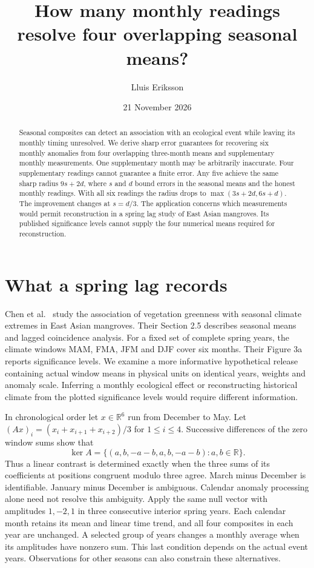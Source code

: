 \documentclass[11pt]{article}
\title{How many monthly readings resolve four overlapping seasonal means?}
\author{Lluis Eriksson}\date{21 November 2026}
\begin{document}
\maketitle
\begin{abstract}
Seasonal composites can detect an association with an ecological event while leaving its monthly timing unresolved. We derive sharp error guarantees for recovering six monthly anomalies from four overlapping three-month means and supplementary monthly measurements. One supplementary month may be arbitrarily inaccurate. Four supplementary readings cannot guarantee a finite error. Any five achieve the same sharp radius $9s+2d$, where $s$ and $d$ bound errors in the seasonal means and the honest monthly readings. With all six readings the radius drops to $\max(3s+2d,6s+d)$. The improvement changes at $s=d/3$. The application concerns which measurements would permit reconstruction in a spring lag study of East Asian mangroves. Its published significance levels cannot supply the four numerical means required for reconstruction.
\end{abstract}
\section{What a spring lag records}
Chen et al.\ \cite{chen} study the association of vegetation greenness with seasonal climate extremes in East Asian mangroves. Their Section 2.5 describes seasonal means and lagged coincidence analysis. For a fixed set of complete spring years, the climate windows MAM, FMA, JFM and DJF cover six months. Their Figure 3a reports significance levels. We examine a more informative hypothetical release containing actual window means in physical units on identical years, weights and anomaly scale. Inferring a monthly ecological effect or reconstructing historical climate from the plotted significance levels would require different information.

In chronological order let $x\in\mathbb R^6$ run from December to May. Let $(Ax)_i=(x_i+x_{i+1}+x_{i+2})/3$ for $1\leq i\leq4$. Successive differences of the zero window sums show that
\[
 \ker A=\{(a,b,-a-b,a,b,-a-b):a,b\in\mathbb R\}.
\]
Thus a linear contrast is determined exactly when the three sums of its coefficients at positions congruent modulo three agree. March minus December is identifiable. January minus December is ambiguous. Calendar anomaly processing alone need not resolve this ambiguity. Apply the same null vector with amplitudes $1,-2,1$ in three consecutive interior spring years. Each calendar month retains its mean and linear time trend, and all four composites in each year are unchanged. A selected group of years changes a monthly average when its amplitudes have nonzero sum. This last condition depends on the actual event years. Observations for other seasons can also constrain these alternatives.
\end{document}
